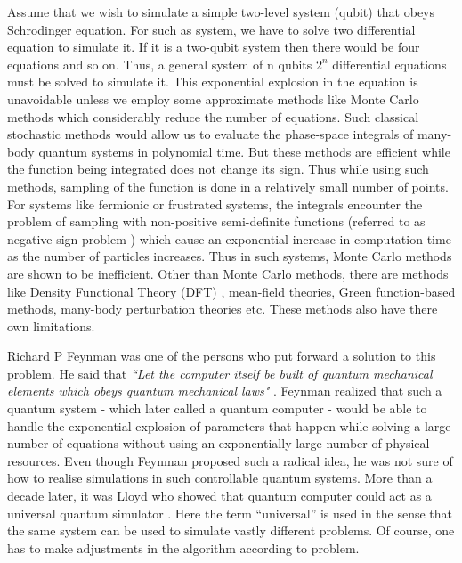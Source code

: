 \documentclass[12pt,a4paper]{report}
\begin{document}
Assume that we wish to simulate a simple two-level system (qubit) that obeys Schrodinger equation. For such as system, we have to solve two differential equation to simulate it. If it is a two-qubit system then there would be four equations and so on. Thus, a general system of n qubits $2^{n}$ differential equations must be solved to simulate it. This exponential explosion in the equation is unavoidable unless we employ some approximate methods like Monte Carlo methods \cite{monte} which considerably reduce the number of equations. Such classical stochastic methods would allow us to evaluate the phase-space integrals of many-body quantum systems in polynomial time. But these methods are efficient while the function being integrated does not change its sign. Thus while using such methods, sampling of the function is done in a relatively small number of points. For systems like fermionic or frustrated systems, the integrals encounter the problem of sampling with non-positive semi-definite functions (referred to as negative sign problem \cite{troyer}\cite{georgescu}) which cause an exponential increase in computation time as the number of particles increases. Thus in such systems, Monte Carlo methods are shown to be inefficient. Other than Monte Carlo methods, there are methods like Density Functional Theory (DFT) \cite{dft}, mean-field theories, Green function-based methods, many-body perturbation theories \cite{mbpt} etc. These methods also have there own limitations.

Richard P Feynman was one of the persons who put forward a solution to this problem. He said that \emph{“Let the computer itself be built of quantum mechanical elements which obeys quantum mechanical laws"} \cite{feynman82}. Feynman realized that such a quantum system - which later called a quantum computer - would be able to handle the exponential explosion of parameters that happen while solving a large number of equations without using an exponentially large number of physical resources. Even though Feynman proposed such a radical idea, he was not sure of how to realise simulations in such controllable quantum systems. More than a decade later, it was Lloyd who showed that quantum computer could act as a universal quantum simulator \cite{lloyd}. Here the term “universal” is used in the sense that the same system can be used to simulate vastly different problems. Of course, one has to make adjustments in the algorithm according to problem. 
\end{document}
